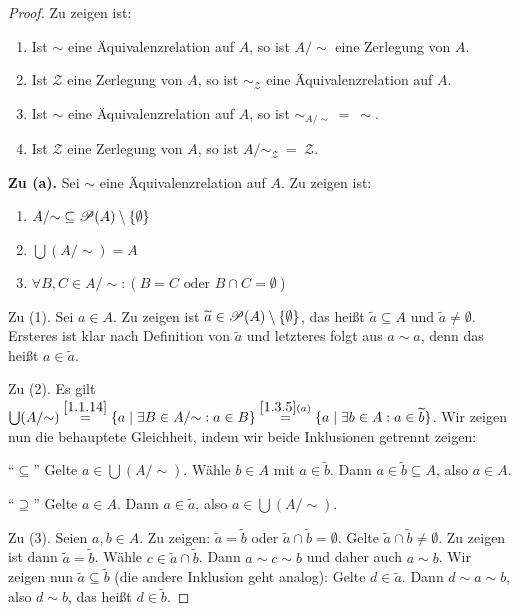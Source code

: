 \documentclass[../../main.tex]{subfiles}
\begin{document}
\begin{proof}
Zu zeigen ist:
\begin{enumerate}[\normalfont(a)]
\item Ist $\sim$ eine Äquivalenzrelation auf $A$, so ist $A/\text{$\sim$}$ eine Zerlegung von $A$.
\item Ist $\mathcal Z$ eine Zerlegung von $A$, so ist $\sim_\mathcal Z$ eine Äquivalenzrelation auf $A$.
\item Ist $\sim$ eine Äquivalenzrelation auf $A$, so ist $\sim_{A/\text{$\sim$}}~=~\sim$.
\item Ist $\mathcal Z$ eine Zerlegung von $A$, so ist $A/\text{$\sim_\mathcal Z$}~=~\mathcal Z$.
\end{enumerate}
\medskip\noindent
{\bf Zu (a).} Sei $\sim$ eine Äquivalenzrelation auf $A$. Zu zeigen ist:
\begin{enumerate}[(1)]
\item $A/\text{$\sim$}\subseteq\mathcal P(A)\setminus\{\emptyset\}$
\item $\bigcup(A/\text{$\sim$})=A$
\item $\forall B,C\in A/\text{$\sim$}:(B=C\text{ oder }B\cap C=\emptyset)$
\end{enumerate}

\noindent
Zu (1). Sei $a\in A$. Zu zeigen ist $\widetilde a\in\mathcal P(A)\setminus\{\emptyset\}$, das heißt $\widetilde a\subseteq A$ und
$\widetilde a\ne\emptyset$. Ersteres ist klar nach Definition von $\widetilde a$ und letzteres folgt aus $a\sim a$, denn das heißt $a\in\widetilde a$.

\smallskip\noindent
Zu (2). Es gilt $\bigcup(A/\text{$\sim$})\overset{\ref{1.1.14}}=\{a\mid\exists B\in A/\text{$\sim$}:a\in B\}\overset{\ref{1.3.5}(a)}=\{a\mid\exists b\in A:a\in\widetilde b\}$. Wir zeigen nun die behauptete Gleichheit, indem wir beide Inklusionen getrennt zeigen:

"`$\subseteq$"' Gelte $a\in\bigcup(A/\text{$\sim$})$. Wähle $b\in A$ mit $a\in\widetilde b$. Dann $a\in\widetilde b\subseteq A$,
also $a\in A$.

"`$\supseteq$"' Gelte $a\in A$. Dann $a\in\widetilde a$, also $a\in\bigcup(A/\text{$\sim$})$.

\smallskip\noindent
Zu (3). Seien $a,b\in A$. Zu zeigen: $\widetilde a=\widetilde b$ oder $\widetilde a\cap\widetilde b=\emptyset$.
Gelte $\widetilde a\cap\widetilde b\ne\emptyset$. Zu zeigen ist dann $\widetilde a=\widetilde b$.
Wähle $c\in\widetilde a\cap\widetilde b$. Dann $a\sim c\sim b$ und daher auch $a\sim b$. Wir zeigen nun
$\widetilde a\subseteq\widetilde b$ (die andere Inklusion geht analog): Gelte $d\in\widetilde a$. Dann $d\sim a\sim b$, also
$d\sim b$, das heißt $d\in\widetilde b$.


\end{proof}
\end{document}
